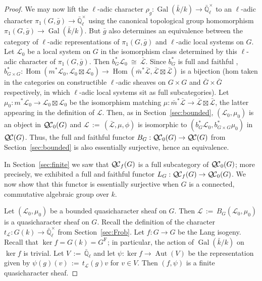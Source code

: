 \documentclass[11pt]{amsart}
\theoremstyle{plain}
\theoremstyle{definition}
\theoremstyle{remark}
\newcommand{\EE}{\mathbb{\bar Q}_\ell}
\newcommand{\bFq}{\bar{k}}
\newcommand{\Fq}{k}
\newcommand{\EEx}{\EE^\times}
\DeclareMathOperator{\Gal}{Gal}
\newcommand{\Frob}[1]{\operatorname{F}_{#1}}
\DeclareMathOperator{\Aut}{Aut}
\DeclareMathOperator{\Hom}{Hom}
\newcommand{\ceq}{{\, :=\, }}
\newcommand{\iso}{{\ \cong\ }}
\newcommand{\qcs}[1]{{\mathcal{#1}}}
\newcommand{\gqcs}[1]{{\mathcal{\bar #1}}}
\newcommand{\QC}{{\mathcal{Q\hskip-0.8pt C}}}
\newcommand{\QCb}{{\QC_0}}
\newcommand{\QCf}{{\QC_f}}
\newcommand{\trFrob}[1]{t_{#1}}
\newcommand{\bg}{\bar{g}}
\begin{document}
\begin{proof}
  We may now lift the $\ell$-adic character $\rho_g : \Gal(\bFq/\Fq) \to \EEx$
  to an $\ell$-adic character $\pi_1(G,\bg) \to \EEx$ using the canonical topological group homomorphism
  $\pi_1(G,\bg) \to \Gal(\bFq/\Fq)$. But $\bg$ also
  determines an equivalence between the category of $\ell$-adic
  representations of $\pi_1(G,\bg)$ and $\ell$-adic local systems on $G$. Let
  $\qcs{L}_0$ be a local system on $G$ in the isomorphism class
  determined by this $\ell$-adic character of $\pi_1(G,\bg)$.
  Then $b_G^*\qcs{L}_0 \iso \gqcs{L}$.
  Since $b_G^*$ is full and faithful
  ,
  $
  b_{G\times G}^* : \Hom(m^*\qcs{L}_0,\qcs{L}_0\boxtimes\qcs{L}_0) \to \Hom({\bar m}^*\gqcs{L},\gqcs{L}\boxtimes\gqcs{L})
  $ 
  is a bijection 
  (hom taken in the categories on constructible $\ell$-adic sheaves on 
  $G\times G$ and ${\bar G}\times {\bar G}$ respectively, 
  in which $\ell$-adic local systems sit as full subcategories). 
  Let $\mu_0 : m^*\qcs{L}_0 \to \qcs{L}_0\boxtimes\qcs{L}_0$ be the isomorphism matching 
  $\mu : {\bar m}^*\gqcs{L} \to \gqcs{L}\boxtimes\gqcs{L}$, 
  the latter appearing in the definition of $\qcs{L}$. 
  Then, as in Section~\ref{sec:bounded}, $(\qcs{L}_0,\mu_0)$ is an object in $\QCb(G)$ 
  and $\qcs{L} \ceq (\gqcs{L},\mu,\phi)$ is isomorphic to $(b_G^*\qcs{L}_0,b_{G\times G}^*\mu_0)$ in $\QC(G)$.
  Thus, the full and faithful functor $B_G : \QCb(G) \to \QC(G)$ from Section~\ref{sec:bounded}
  is also essentially surjective, hence an equivalence.
  
  In Section~\ref{sec:finite} we saw that $\QCf(G)$ is a full subcategory of $\QCb(G)$;
  more precisely, we exhibited a full and faithful functor $L_G : \QCf(G) \to \QCb(G)$.
  We now show that this functor is essentially surjective 
  when $G$ is a connected, commutative algebraic group over $\Fq$.
  
  Let $(\qcs{L}_0,\mu_0)$ be a bounded quasicharacter sheaf on $G$. 
  Then $\qcs{L}\ceq B_G(\qcs{L}_0,\mu_0)$ is a quasicharacter sheaf on $G$.
  Recall the definition of the character $\trFrob{\qcs{L}} : G(\Fq) \to \EEx$ from Section~\ref{sec:Frob}. 
  Let $f : G\to G$ be the Lang isogeny.
  Recall that $\ker f = G(\Fq) = G^{\Frob{}}$; 
  in particular, the action of $\Gal(\bFq/\Fq)$ on $\ker f$ is trivial.
  Let $V \ceq \EE$ and let $\psi : \ker f \to \Aut(V)$ be the representation given by 
  $\psi(g)(v) \ceq \trFrob{\qcs{L}}(g) v$ for $v\in V$. 
  Then $(f,\psi)$ is a finite quasicharacter sheaf. 
  

\end{proof}
\end{document}

